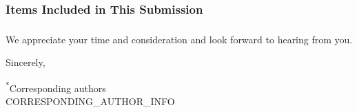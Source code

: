 \documentclass[11pt]{article}
\begin{document}
\subsubsection{Items Included in This Submission}

\subsubsection{}

\subsubsection{}
\noindent We appreciate your time and consideration and look forward to hearing from you.

\bigskip
\noindent Sincerely,

\bigskip
{}

\medskip
\noindent\textsuperscript{*}Corresponding authors\\
{{CORRESPONDING_AUTHOR_INFO}}


\end{document}
